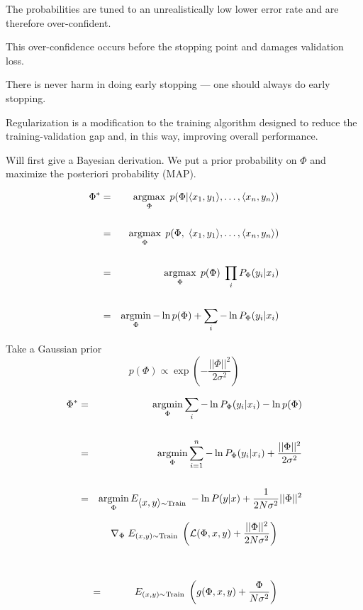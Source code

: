 {\vfill
The probabilities are tuned to an unrealistically low lower error rate and are therefore over-confident.

\vfill
This over-confidence occurs before the stopping point and damages validation loss.


There is never harm in doing early stopping --- one should always do early stopping.

\vfill
Regularization is a modification to the training algorithm designed to reduce the training-validation gap and, in this way, improving overall performance.


Will first give a Bayesian derivation. We put a prior probability on $\Phi$ and maximize the posteriori probability (MAP).

\vfill
\begin{eqnarray*}
\Phi^* & = & \operatorname*{argmax}_\Phi\;p(\Phi | {\mbox{$\langle x_1,y_1\rangle$}},\ldots,{\mbox{$\langle x_n,y_n\rangle$}}) \\
\\
 & = & \operatorname*{argmax}_\Phi\;p(\Phi,\;{\mbox{$\langle x_1,y_1\rangle$}},\ldots,{\mbox{$\langle x_n,y_n\rangle$}}) \\
 \\
 & = & \operatorname*{argmax}_\Phi \; p(\Phi)\;\prod_i P_\Phi(y_i|x_i) \\
 \\
 & = & \operatorname*{argmin}_\Phi -\ln  p(\Phi) + \sum_i - \ln P_\Phi(y_i|x_i)
 \end{eqnarray*}


Take a Gaussian prior {\color{red} $$p(\Phi) \propto \exp\left(-\frac{||\Phi||^2}{2\sigma^2}\right)$$}

\vfill
\begin{eqnarray*}
\Phi^* & = & \operatorname*{argmin}_\Phi \sum_i - \ln P_\Phi(y_i|x_i) -\ln  p(\Phi)  \\
\\
& = & \operatorname*{argmin}_\Phi \sum_{i = 1}^n - \ln P_\Phi(y_i|x_i) + \frac{||\Phi||^2}{2\sigma^2}  \\
\\
& = & \operatorname*{argmin}_\Phi E_{{\mbox{$\langle x,y\rangle$}}\sim \mathrm{Train}}\;-\ln P(y|x) + \frac{1}{2N\sigma^2} ||\Phi||^2
\end{eqnarray*}


\begin{eqnarray*}
  & & \nabla_\Phi \;E_{(x,y) \sim \mathrm{Train}}\;\left({\cal L}(\Phi,x,y) + \frac{||\Phi||^2}{2N\sigma^2}\right) \\
  \\
  \\
  & = & E_{(x,y) \sim \mathrm{Train}} \;\left(g(\Phi,x,y) + \frac{\Phi}{N\sigma^2}\right)
\end{eqnarray*}

}
